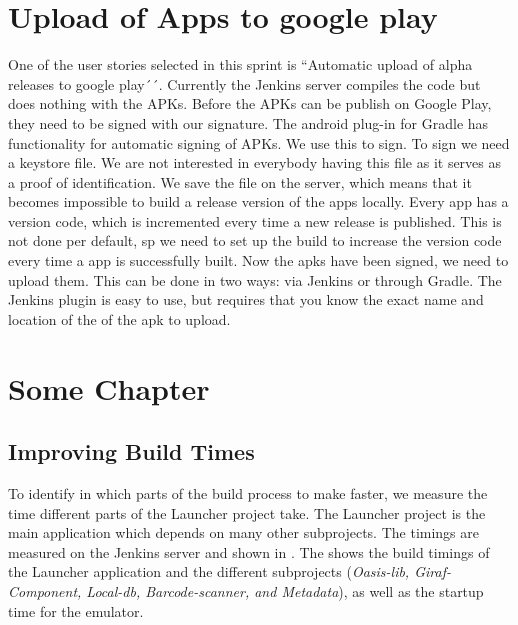 

\chapter{Upload of Apps to google play}
One of the user stories selected in this sprint is ``Automatic upload of alpha releases to google play´´. Currently the Jenkins server compiles the code but does nothing with the APKs. Before the APKs can be publish on Google Play, they need to be signed with our signature. The android plug-in for Gradle has functionality for automatic signing of APKs. We use this to sign. To sign we need a keystore file. We are not interested in everybody having this file as it serves as a proof of identification. We save the file on the server, which means that it becomes impossible to build a release version of the apps locally.
Every app has a version code, which is incremented every time a new release is published. This is not done per default, sp we need to set up the build to increase the version code every time a app is successfully built. 
Now the apks have been signed, we need to upload them. This can be done in two ways: via Jenkins\parencite{jenkins-play-plugin} or through Gradle\parencite{gradle-play-plugin}. The Jenkins plugin is easy to use, but requires that you know the exact name and location of the of the apk to upload.


\chapter{Some Chapter}
\section{Improving Build Times}

To identify in which parts of the build process to make faster, we measure the time different parts of the Launcher project take. The Launcher project is the main application which depends on many other subprojects. The timings are measured on the Jenkins server and shown in . The shows the build timings of the Launcher application and the different subprojects (\emph{Oasis-lib, Giraf-Component, Local-db, Barcode-scanner, and Metadata}), as well as the startup time for the emulator.

